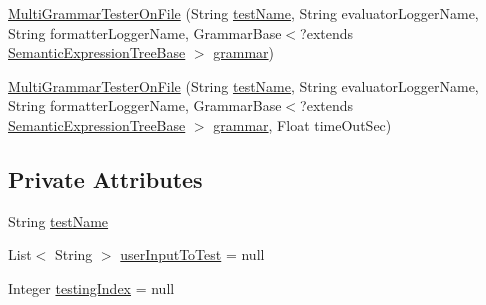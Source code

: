\begin{DoxyCompactItemize}
\item 
\hyperlink{classit_1_1emarolab_1_1cagg_1_1interfaces_1_1CaggMultiGrammarTesterOnFile_1_1MultiGrammarTesterOnFile_acf6f12f90538013d1361061e5f4f1c53}{Multi\-Grammar\-Tester\-On\-File} (String \hyperlink{classit_1_1emarolab_1_1cagg_1_1interfaces_1_1CaggMultiGrammarTesterOnFile_1_1MultiGrammarTesterOnFile_ab134ae20ad2d5a97de6633ae41d6716d}{test\-Name}, String evaluator\-Logger\-Name, String formatter\-Logger\-Name, Grammar\-Base$<$?extends \hyperlink{interfaceit_1_1emarolab_1_1cagg_1_1core_1_1evaluation_1_1semanticGrammar_1_1syntaxCompiler_1_1SemanticExpressionTreeBase}{Semantic\-Expression\-Tree\-Base} $>$ \hyperlink{classit_1_1emarolab_1_1cagg_1_1core_1_1evaluation_1_1interfacing_1_1GrammarTesterBase_ac6601808f37ef4327e6308143f01dc6a}{grammar})
\item 
\hyperlink{classit_1_1emarolab_1_1cagg_1_1interfaces_1_1CaggMultiGrammarTesterOnFile_1_1MultiGrammarTesterOnFile_a7f652d68ebeb3e57daee278c6aaeec6e}{Multi\-Grammar\-Tester\-On\-File} (String \hyperlink{classit_1_1emarolab_1_1cagg_1_1interfaces_1_1CaggMultiGrammarTesterOnFile_1_1MultiGrammarTesterOnFile_ab134ae20ad2d5a97de6633ae41d6716d}{test\-Name}, String evaluator\-Logger\-Name, String formatter\-Logger\-Name, Grammar\-Base$<$?extends \hyperlink{interfaceit_1_1emarolab_1_1cagg_1_1core_1_1evaluation_1_1semanticGrammar_1_1syntaxCompiler_1_1SemanticExpressionTreeBase}{Semantic\-Expression\-Tree\-Base} $>$ \hyperlink{classit_1_1emarolab_1_1cagg_1_1core_1_1evaluation_1_1interfacing_1_1GrammarTesterBase_ac6601808f37ef4327e6308143f01dc6a}{grammar}, Float time\-Out\-Sec)
\end{DoxyCompactItemize}
\subsection*{Private Attributes}
\begin{DoxyCompactItemize}
\item 
String \hyperlink{classit_1_1emarolab_1_1cagg_1_1interfaces_1_1CaggMultiGrammarTesterOnFile_1_1MultiGrammarTesterOnFile_ab134ae20ad2d5a97de6633ae41d6716d}{test\-Name}
\item 
List$<$ String $>$ \hyperlink{classit_1_1emarolab_1_1cagg_1_1interfaces_1_1CaggMultiGrammarTesterOnFile_1_1MultiGrammarTesterOnFile_a93d89bd3fd1b8f94fa8b3ef7b5dccd09}{user\-Input\-To\-Test} = null
\item 
Integer \hyperlink{classit_1_1emarolab_1_1cagg_1_1interfaces_1_1CaggMultiGrammarTesterOnFile_1_1MultiGrammarTesterOnFile_a162a017875978ba2c3c64bed12f4205d}{testing\-Index} = null
\end{DoxyCompactItemize}
